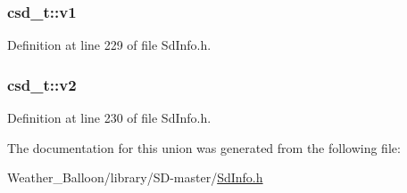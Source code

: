 \subsubsection[{\texorpdfstring{v1}{v1}}]{ csd\+\_\+t\+::v1}\hypertarget{unioncsd__t_acb1d09f122f32629d8d6faa9edcc943b}{}\label{unioncsd__t_acb1d09f122f32629d8d6faa9edcc943b}


Definition at line 229 of file Sd\+Info.\+h.

\subsubsection[{\texorpdfstring{v2}{v2}}]{ csd\+\_\+t\+::v2}\hypertarget{unioncsd__t_a19b60555856c9a485bcf4a84c248bfea}{}\label{unioncsd__t_a19b60555856c9a485bcf4a84c248bfea}


Definition at line 230 of file Sd\+Info.\+h.



The documentation for this union was generated from the following file\+:\begin{DoxyCompactItemize}
\item 
Weather\+\_\+\+Balloon/library/\+S\+D-\/master/\hyperlink{_sd_info_8h}{Sd\+Info.\+h}\end{DoxyCompactItemize}
